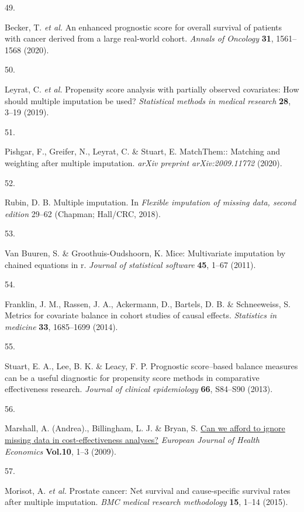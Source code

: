 \documentclass[
  letterpaper,
  DIV=11,
  numbers=noendperiod]{scrartcl}
\newlength{\cslhangindent}
\newlength{\csllabelwidth}
\newenvironment{CSLReferences}[2] %
 {\begin{list}{}{%
  \setlength{\itemindent}{0pt}
  \setlength{\leftmargin}{0pt}
  \setlength{\parsep}{0pt}
  \ifodd #1
   \setlength{\leftmargin}{\cslhangindent}
   \setlength{\itemindent}{-1\cslhangindent}
  \fi
  \setlength{\itemsep}{#2\baselineskip}}}
 {\end{list}}
\newcommand{\CSLLeftMargin}[1]{\parbox[t]{\csllabelwidth}{\strut#1\strut}}
\newcommand{\CSLRightInline}[1]{\parbox[t]{\linewidth - \csllabelwidth}{\strut#1\strut}}
\begin{document}
\begin{CSLReferences}{0}{0}
\CSLLeftMargin{49. }%
\CSLRightInline{Becker, T. \emph{et al.} An enhanced prognostic score
for overall survival of patients with cancer derived from a large
real-world cohort. \emph{Annals of Oncology} \textbf{31}, 1561--1568
(2020).}

\CSLLeftMargin{50. }%
\CSLRightInline{Leyrat, C. \emph{et al.} Propensity score analysis with
partially observed covariates: How should multiple imputation be used?
\emph{Statistical methods in medical research} \textbf{28}, 3--19
(2019).}

\CSLLeftMargin{51. }%
\CSLRightInline{Pishgar, F., Greifer, N., Leyrat, C. \& Stuart, E.
MatchThem:: Matching and weighting after multiple imputation.
\emph{arXiv preprint arXiv:2009.11772} (2020).}

\CSLLeftMargin{52. }%
\CSLRightInline{Rubin, D. B. Multiple imputation. In \emph{Flexible
imputation of missing data, second edition} 29--62 (Chapman; Hall/CRC,
2018).}

\CSLLeftMargin{53. }%
\CSLRightInline{Van Buuren, S. \& Groothuis-Oudshoorn, K. Mice:
Multivariate imputation by chained equations in r. \emph{Journal of
statistical software} \textbf{45}, 1--67 (2011).}

\CSLLeftMargin{54. }%
\CSLRightInline{Franklin, J. M., Rassen, J. A., Ackermann, D., Bartels,
D. B. \& Schneeweiss, S. Metrics for covariate balance in cohort studies
of causal effects. \emph{Statistics in medicine} \textbf{33}, 1685--1699
(2014).}

\CSLLeftMargin{55. }%
\CSLRightInline{Stuart, E. A., Lee, B. K. \& Leacy, F. P. Prognostic
score--based balance measures can be a useful diagnostic for propensity
score methods in comparative effectiveness research. \emph{Journal of
clinical epidemiology} \textbf{66}, S84--S90 (2013).}

\CSLLeftMargin{56. }%
\CSLRightInline{Marshall, A. (Andrea)., Billingham, L. J. \& Bryan, S.
\href{https://doi.org/10.1007/s10198-008-0129-y\%0A}{Can we afford to
ignore missing data in cost-effectiveness analyses?} \emph{European
Journal of Health Economics} \textbf{Vol.10}, 1--3 (2009).}

\CSLLeftMargin{57. }%
\CSLRightInline{Morisot, A. \emph{et al.} Prostate cancer: Net survival
and cause-specific survival rates after multiple imputation. \emph{BMC
medical research methodology} \textbf{15}, 1--14 (2015).}


\end{CSLReferences}
\end{document}
